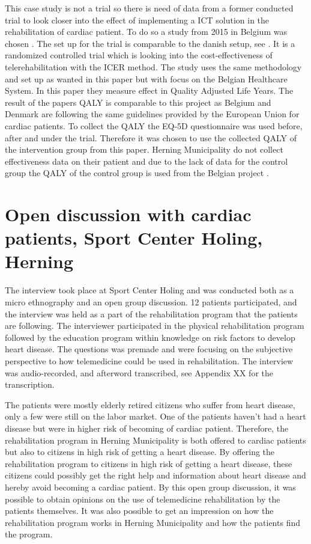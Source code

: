 
This case study is not a trial so there is need of data from a former conducted trial to look closer into the effect of implementing a ICT solution in the rehabilitation of cardiac patient. To do so a study from 2015 in Belgium was chosen \cite{costeffect}. The set up for the trial is comparable to the danish setup, see . It is a randomized controlled trial which is looking into the cost-effectiveness of telerehabilitation with the ICER method. The study uses the same methodology and set up as wanted in this paper but with focus on the Belgian Healthcare System. In this paper they measure effect in Quality Adjusted Life Years. The result of the papers QALY is comparable to this project as Belgium and Denmark are following the same guidelines provided by the European Union for cardiac patients. To collect the QALY the EQ-5D questionnaire was used before, after and under the trial. Therefore it was chosen to use the collected QALY of the intervention group from this paper. Herning Municipality do not collect effectiveness data on their patient and due to the lack of data for the control group the QALY of the control group is used from the Belgian project \cite{costeffect}.

\section{Open discussion with cardiac patients, Sport Center Holing, Herning}
\label{patientinterview} 

The interview took place at Sport Center Holing and was conducted both as a micro ethnography and an open group discussion. 12 patients participated, and the interview was held as a part of the rehabilitation program that the patients are following.  The interviewer participated in the physical rehabilitation program followed by the education program within knowledge on risk factors to develop heart disease. The questions was premade and were focusing on the subjective perspective to how telemedicine could be used in rehabilitation. The interview was audio-recorded, and afterword transcribed, see Appendix XX for the transcription. 

The patients were mostly elderly retired citizens who suffer from heart disease, only a few were still on the labor market. One of the patients haven’t had a heart disease but were in higher risk of becoming of cardiac patient. Therefore, the rehabilitation program in Herning Municipality is both offered to cardiac patients but also to citizens in high risk of getting a heart disease. By offering the rehabilitation program to citizens in high risk of getting a heart disease, these citizens could possibly get the right help and information about heart disease and hereby avoid becoming a cardiac patient. By this open group discussion, it was possible to obtain opinions on the use of telemedicine rehabilitation by the patients themselves. It was also possible to get an impression on how the rehabilitation program works in Herning Municipality and how the patients find the program. 

